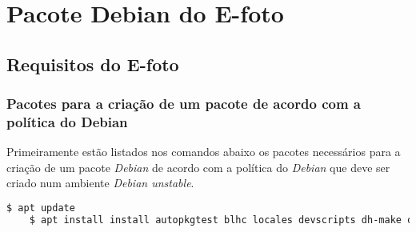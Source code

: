 \chapter{Pacote Debian do E-foto}
\section{Requisitos do E-foto}

\subsection{Pacotes para a criação de um pacote de acordo com a política do Debian}

Primeiramente estão listados nos comandos abaixo os pacotes necessários para a criação de um pacote \textit{Debian} de acordo com a política do \textit{Debian} que deve ser criado num ambiente \textit{Debian unstable}. 

\begin{lstlisting}[language=bash]
	$ apt update
	$ apt install install autopkgtest blhc locales devscripts dh-make dput-ng git-buildpackage mc quilt spell tardiff tree
\end{lstlisting}

